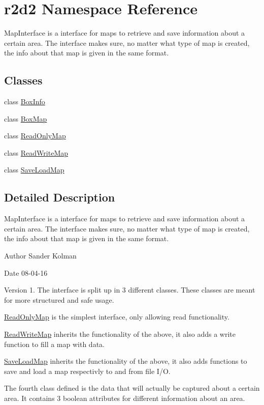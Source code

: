 \hypertarget{namespacer2d2}{}\section{r2d2 Namespace Reference}
\label{namespacer2d2}


Map\+Interface is a interface for maps to retrieve and save information about a certain area. The interface makes sure, no matter what type of map is created, the info about that map is given in the same format.  


\subsection*{Classes}
\begin{DoxyCompactItemize}
\item 
class \hyperlink{classr2d2_1_1_box_info}{Box\+Info}
\item 
class \hyperlink{classr2d2_1_1_box_map}{Box\+Map}
\item 
class \hyperlink{classr2d2_1_1_read_only_map}{Read\+Only\+Map}
\item 
class \hyperlink{classr2d2_1_1_read_write_map}{Read\+Write\+Map}
\item 
class \hyperlink{classr2d2_1_1_save_load_map}{Save\+Load\+Map}
\end{DoxyCompactItemize}


\subsection{Detailed Description}
Map\+Interface is a interface for maps to retrieve and save information about a certain area. The interface makes sure, no matter what type of map is created, the info about that map is given in the same format. 

\begin{DoxyAuthor}{Author}
Sander Kolman 
\end{DoxyAuthor}
\begin{DoxyDate}{Date}
08-\/04-\/16 
\end{DoxyDate}
\begin{DoxyVersion}{Version}
1. The interface is split up in 3 different classes. These classes are meant for more structured and safe usage.
\begin{DoxyItemize}
\item \hyperlink{classr2d2_1_1_read_only_map}{Read\+Only\+Map} is the simplest interface, only allowing read functionality.
\item \hyperlink{classr2d2_1_1_read_write_map}{Read\+Write\+Map} inherits the functionality of the above, it also adds a write function to fill a map with data.
\item \hyperlink{classr2d2_1_1_save_load_map}{Save\+Load\+Map} inherits the functionality of the above, it also adds functions to save and load a map respectivly to and from file I/\+O.
\end{DoxyItemize}
\end{DoxyVersion}
The fourth class defined is the data that will actually be captured about a certain area. It contains 3 boolean attributes for different information about an area.

